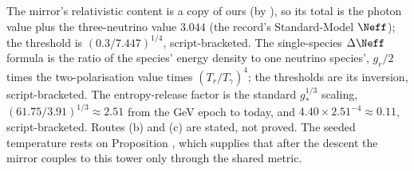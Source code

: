 The mirror's relativistic content is a copy of ours (by ), so its total is the photon value plus the three-neutrino value $3.044$ (the record's Standard-Model $\Neff$); the threshold is $(0.3/7.447)^{1/4}$, script-bracketed. The single-species $\Delta\Neff$ formula is the ratio of the species' energy density to one neutrino species', $g_{r}/2$ times the two-polarisation value times $(T_{r}/T_{\gamma})^{4}$; the thresholds are its inversion, script-bracketed. The entropy-release factor is the standard $g_{*}^{1/3}$ scaling, $(61.75/3.91)^{1/3} \approx 2.51$ from the GeV epoch to today, and $4.40 \times 2.51^{-4} \approx 0.11$, script-bracketed. Routes (b) and (c) are stated, not proved. The seeded temperature rests on Proposition , which supplies that after the descent the mirror couples to this tower only through the shared metric.

